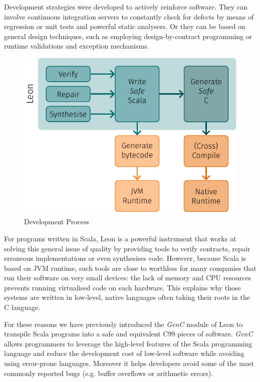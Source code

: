 \documentclass[a4paper,twoside]{article}
\newcommand{\GenC}{\emph{GenC}\xspace}
\begin{document}
Development strategies were developed to actively reinforce software. They can
involve continuous integration servers to constantly check for defects by means
of regression or unit tests and powerful static analysers. Or they can be based
on general design techniques, such as employing design-by-contract programming
or runtime validations and exception mechanisms.

\begin{figure}[!h]
  \centering
  \includegraphics{res/dev_process.pdf}
  \caption{Development Process}
  \label{fig:dev-pipeline}
\end{figure}

For programs written in Scala, Leon \cite{leonweb} is a powerful instrument that
works at solving this general issue of quality by providing tools to verify
contracts, repair erroneous implementations or even synthesises code. However,
because Scala is based on JVM runtime, such tools are close to worthless for
many companies that run their software on very small devices: the lack of memory
and CPU resources prevents running virtualised code on such hardware. This
explains why those systems are written in low-level, native languages often
taking their roots in the C language.

For these reasons we have previously introduced the \GenC module of Leon
\cite{genc1} to transpile Scala programs into a safe and equivalent C99 pieces
of software. \GenC allows programmers to leverage the high-level features of the
Scala programming language and reduce the development cost of low-level software
while avoiding using error-prone languages. Moreover it helps developers avoid
some of the most commonly reported bugs (e.g. buffer overflows or arithmetic
errors).
\end{document}
